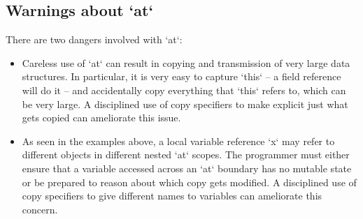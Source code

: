 \subsection{Warnings about \xcd`at`}
There are two dangers involved with \xcd`at`: 
\begin{itemize}
\item Careless use of \xcd`at` can result in copying and transmission
of very large data structures.  
In particular, it is very easy to capture
\xcd`this` -- a field reference will do it -- and accidentally copy everything
that \xcd`this` refers to, which can be very large.  A disciplined use of copy
specifiers to make explicit just what gets copied can ameliorate this issue.

\item As seen in the examples above, a local variable reference
  \xcd`x` may refer to different objects in different nested \xcd`at`
  scopes. The programmer must either ensure that a variable accessed
  across an \xcd`at` boundary has no mutable state or be prepared to
  reason about which copy gets modified.   A disciplined use of copy specifiers to give
  different names to variables can ameliorate this concern.
\end{itemize}


